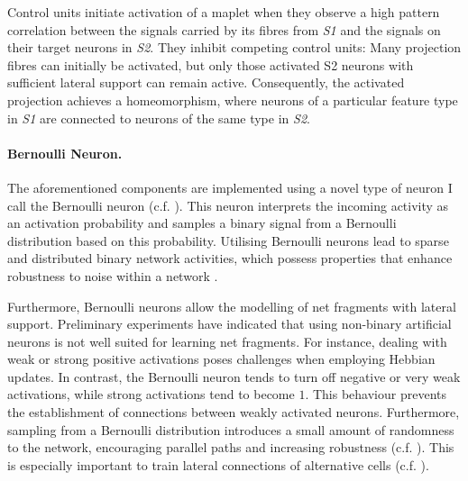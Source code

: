 Control units initiate activation of a maplet when they observe a high pattern correlation between the signals carried by its fibres from \emph{S1} and the signals on their target neurons in \emph{S2}. They inhibit competing control units: Many projection fibres can initially be activated, but only those activated S2 neurons with sufficient lateral support can remain active.
Consequently, the activated projection achieves a homeomorphism, where neurons of a particular feature type in \emph{S1} are connected to neurons of the same type in \emph{S2}.

\paragraph{Bernoulli Neuron.} The aforementioned components are implemented using a novel type of neuron I call the Bernoulli neuron (c.f. ). This neuron interprets the incoming activity as an activation probability and samples a binary signal from a Bernoulli distribution based on this probability. Utilising Bernoulli neurons lead to sparse and distributed binary network activities, which possess properties that enhance robustness to noise within a network .

Furthermore, Bernoulli neurons allow the modelling of net fragments with lateral support. Preliminary experiments have indicated that using non-binary artificial neurons is not well suited for learning net fragments. For instance, dealing with weak or strong positive activations poses challenges when employing Hebbian updates. In contrast, the Bernoulli neuron tends to turn off negative or very weak activations, while strong activations tend to become $1$. This behaviour prevents the establishment of connections between weakly activated neurons. Furthermore, sampling from a Bernoulli distribution introduces a small amount of randomness to the network, encouraging parallel paths and increasing robustness (c.f. ). This is especially important to train lateral connections of alternative cells (c.f. ).


